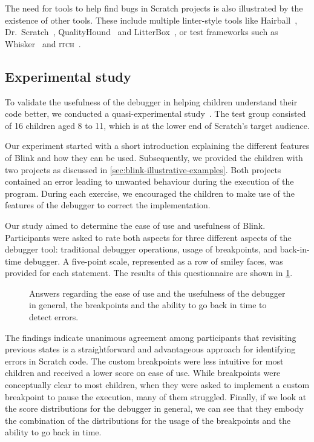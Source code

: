 \documentclass[../main]{subfiles}
\begin{document}
The need for tools to help find bugs in Scratch projects is also illustrated by the existence of other tools.
These include multiple linter-style tools like Hairball~\autocite{boeHairballLintinspiredStatic2013}, Dr.\ Scratch~\autocite{moreno-leonDrScratchWeb2015}, QualityHound~\autocite{techapalokulQualityHoundOnline2017} and LitterBox~\autocite{fraserLitterBoxLinterScratch2021}, or test frameworks such as Whisker~\autocite{stahlbauerTestingScratchPrograms2019} and \textsc{itch}~\autocite{johnsonITCHIndividualTesting2016}.

\subsection{Experimental study}\label{subsec:blink-experimental-study}
To validate the usefulness of the debugger in helping children understand their code better, we conducted a quasi-experimental study~\autocite{shadishExperimentalQuasiexperimentalDesigns2002}.
The test group consisted of 16 children aged 8 to 11, which is at the lower end of Scratch's target audience.

Our experiment started with a short introduction explaining the different features of Blink and how they can be used.
Subsequently, we provided the children with two projects as discussed in \cref{sec:blink-illustrative-examples}.
Both projects contained an error leading to unwanted behaviour during the execution of the program.
During each exercise, we encouraged the children to make use of the features of the debugger to correct the implementation.

Our study aimed to determine the ease of use and usefulness of Blink.
Participants were asked to rate both aspects for three different aspects of the debugger tool: traditional debugger operations, usage of breakpoints, and back-in-time debugger.
A five-point scale, represented as a row of smiley faces, was provided for each statement.
The results of this questionnaire are shown in \cref{fig:blink-results}.

\begin{figure}
    \centering
    
    \caption{
        Answers regarding the ease of use and the usefulness of the debugger in general,
        the breakpoints and the ability to go back in time to detect errors.
    }
    \label{fig:blink-results}
\end{figure}

The findings indicate unanimous agreement among participants that revisiting previous states is a straightforward and advantageous approach for identifying errors in Scratch code.
The custom breakpoints were less intuitive for most children and received a lower score on ease of use.
While breakpoints were conceptually clear to most children, when they were asked to implement a custom breakpoint to pause the execution, many of them struggled.
Finally, if we look at the score distributions for the debugger in general, we can see that they embody the combination of the distributions for the usage of the breakpoints and the ability to go back in time.
\end{document}
